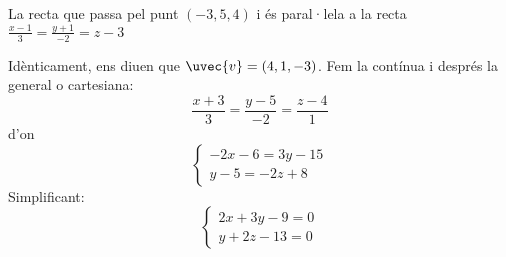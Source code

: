 \begin{llista}
    \item La recta que passa pel punt $(-3,5,4)$ i és paral·lela a la recta $\frac{x-1}{3}=\frac{y+1}{-2}=z-3$

 Idènticament, ens diuen que $\uvec{v}=(4,1,-3)$. Fem la contínua i després la general o cartesiana:
 \[
 \frac{x+3}{3}=\frac{y-5}{-2}=\frac{z-4}{1}
 \]
 d'on
 \[
 \begin{cases}-2x-6=3y-15\\y-5=-2z+8\end{cases}
 \]
 Simplificant:
 \[
 \begin{cases}2x+3y-9=0\\y+2z-13=0\end{cases}
 \]
 \blacksquare


\end{llista}
